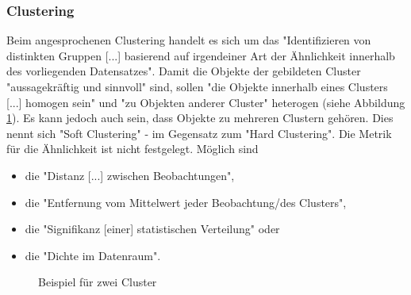 \subsubsection{Clustering}
Beim angesprochenen Clustering handelt es sich um das "Identifizieren von distinkten Gruppen [...] basierend auf irgendeiner Art der Ähnlichkeit innerhalb des vorliegenden Datensatzes"\citep[S.~195; eigene Übersetzung]{swamynathan_mastering_2017}. Damit die Objekte der gebildeten Cluster "aussagekräftig und sinnvoll" sind, sollen "die Objekte innerhalb eines Clusters [...] homogen sein" und "zu Objekten anderer Cluster"\citep[S.~337; eigene Übersetzung]{ramasubramanian_machine_2017} heterogen (siehe Abbildung \ref{fig:clustering}). Es kann jedoch auch sein, dass Objekte zu mehreren Clustern gehören. Dies nennt sich "Soft Clustering" - im Gegensatz zum "Hard Clustering"\citep[S.~339]{ramasubramanian_machine_2017}. Die Metrik für die Ähnlichkeit ist nicht festgelegt. Möglich sind 
\begin{itemize}
\item die "Distanz [...] zwischen Beobachtungen", 
\item die "Entfernung vom Mittelwert jeder Beobachtung/des Clusters",
\item die "Signifikanz [einer] statistischen Verteilung" oder
\item die "Dichte im Datenraum"\citep[S.~338; eigene Übersetzung]{ramasubramanian_machine_2017}.
\end{itemize}
\begin{figure}[H]
\centering
{}
\caption{Beispiel für zwei Cluster \citep[S.~9]{suthaharan_machine_2016}}
\label{fig:clustering}
\end{figure}

